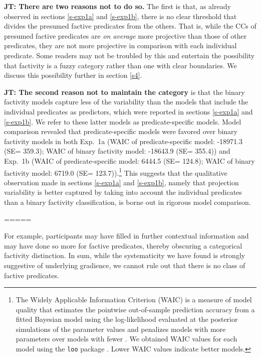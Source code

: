 \documentclass[11pt,fleqn]{article}
\newcommand{\6}{\mbox{$[\hspace*{-.6mm}[$}}
\newcommand{\9}{\mbox{$]\hspace*{-.6mm}]$}}
\newcommand{\jt}[1]{\textbf{\color{blue}JT: #1}}
\begin{document}

\jt{There are two reasons not to do so.} The first is that, as already observed in sections  \ref{s-exp1a} and \ref{s-exp1b}, there is no clear threshold that divides the presumed factive predicates from the others. That is, while the CCs of presumed factive predicates are \emph{on average} more projective than those of other predicates, they are not more projective in comparison with each individual predicate.  Some readers may not be troubled by this and entertain the possibility that factivity is a fuzzy category rather than one with clear boundaries. We discuss this possibility further in section \ref{s4}.

\jt{The second reason not to maintain the category} is that the binary factivity models capture less of the variability than the models that include the individual predicates as predictors, which were reported in sections \ref{s-exp1a} and \ref{s-exp1b}. We refer to these latter models as predicate-specific models. Model comparison revealed that predicate-specific models were favored over binary factivity models in both Exp.~1a (WAIC of predicate-specific model: -18971.3 (SE= 359.3); WAIC of binary factivity model: -18643.9 (SE= 355.4))  and Exp.~1b (WAIC of predicate-specific model: 6444.5 (SE= 124.8); WAIC of binary factivity model: 6719.0 (SE= 123.7)).\footnote{The Widely Applicable Information Criterion (WAIC) is a measure of model quality that estimates the pointwise out-of-sample prediction accuracy from a fitted Bayesian model using the log-likelihood evaluated at the posterior simulations of the parameter values and penalizes models with more parameters over models with fewer \citep{watanabe2010}. We obtained WAIC values for each model using the \texttt{loo} package \citep{vehtari2017}. Lower WAIC values indicate better models.} This suggests that the qualitative observation made in sections  \ref{s-exp1a} and \ref{s-exp1b}, namely that projection variability is better captured by taking into account the individual predicates than a binary factivity classification, is borne out in rigorous model comparison. 


=====

For example, participants may have filled in further contextual information and may have done so more for factive predicates, thereby obscuring a categorical factivity distinction. In sum, while the systematicity we have found is strongly suggestive of underlying gradience, we cannot rule out that there is no class of factive predicates.
\end{document}
